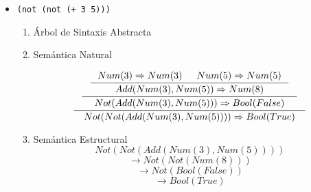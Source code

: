 \documentclass{article}
\begin{document}
\begin{enumerate}
\begin{itemize}
\begin{enumerate}
        \end{enumerate}
        
        \item \texttt{(not (not (+ 3 5)))}

        \begin{enumerate}
            \item Árbol de Sintaxis Abstracta
            
                \begin{figure}[!htb]
                    \centering
                \end{figure}
                
            \item Semántica Natural
            
                \[ 
                    \inference{
                        \inference{
                            \inference{
                                Num(3) \Rightarrow Num(3) &
                                Num(5) \Rightarrow Num(5)
                            }{
                                Add(Num(3),Num(5)) \Rightarrow Num(8)
                            }
                        }{
                            Not(Add(Num(3),Num(5))) \Rightarrow Bool(False)
                        }
                    }{
                        Not(Not(Add(Num(3),Num(5)))) \Rightarrow Bool(True)
                    }
                \]

            \item Semántica Estructural
                \[ Not(Not(Add(Num(3),Num(5)))) \]
                \[ \rightarrow Not(Not(Num(8))) \]
                \[ \rightarrow Not(Bool(False)) \]
                \[ \rightarrow Bool(True) \]
        \end{enumerate}
    \end{itemize}


\end{enumerate}
\end{document}

